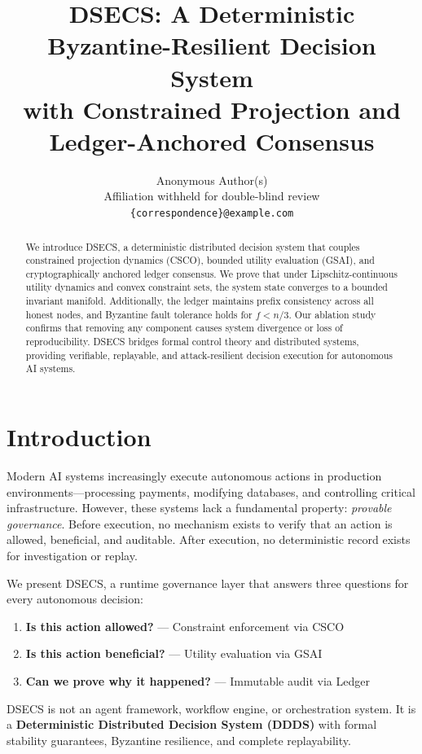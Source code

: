 \documentclass{article}
\title{DSECS: A Deterministic Byzantine-Resilient Decision System\\
       with Constrained Projection and Ledger-Anchored Consensus}
\author{Anonymous Author(s) \\
  Affiliation withheld for double-blind review \\
  \texttt{\{correspondence\}@example.com}
}
\begin{document}
\maketitle

\begin{abstract}
We introduce DSECS, a deterministic distributed decision system that couples
constrained projection dynamics (CSCO), bounded utility evaluation (GSAI),
and cryptographically anchored ledger consensus.
We prove that under Lipschitz-continuous utility dynamics and convex
constraint sets, the system state converges to a bounded invariant manifold.
Additionally, the ledger maintains prefix consistency across all honest nodes,
and Byzantine fault tolerance holds for $f < n/3$.
Our ablation study confirms that removing any component causes system
divergence or loss of reproducibility.
DSECS bridges formal control theory and distributed systems, providing
verifiable, replayable, and attack-resilient decision execution for
autonomous AI systems.
\end{abstract}

\section{Introduction}

Modern AI systems increasingly execute autonomous actions in production
environments---processing payments, modifying databases, and controlling
critical infrastructure.
However, these systems lack a fundamental property: \emph{provable
governance}.
Before execution, no mechanism exists to verify that an action is allowed,
beneficial, and auditable.
After execution, no deterministic record exists for investigation or replay.

We present DSECS, a runtime governance layer that answers three questions
for every autonomous decision:
\begin{enumerate}
    \item \textbf{Is this action allowed?} --- Constraint enforcement via CSCO
    \item \textbf{Is this action beneficial?} --- Utility evaluation via GSAI
    \item \textbf{Can we prove why it happened?} --- Immutable audit via Ledger
\end{enumerate}

DSECS is not an agent framework, workflow engine, or orchestration system.
It is a \textbf{Deterministic Distributed Decision System (DDDS)} with
formal stability guarantees, Byzantine resilience, and complete replayability.
\end{document}
